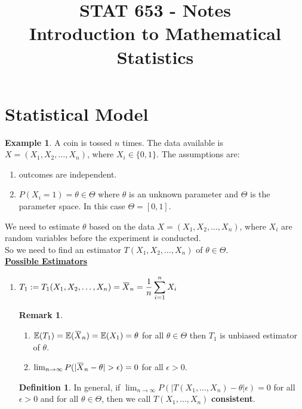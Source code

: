 \documentclass[12pt]{article}
\title{STAT 653 - Notes \\
Introduction to Mathematical Statistics}
\newcommand{\overbar}[1]{\mkern 1.5mu\overline{\mkern-1.5mu#1\mkern-1.5mu}\mkern 1.5mu}
\theoremstyle{definition}
\newtheorem*{definition}{Definition}
\newtheorem*{example}{Example}
\newtheorem*{remark}{Remark}
\begin{document}
\maketitle
\tableofcontents

\section{Statistical Model}

\begin{example}
A coin is tossed $n$ times. The data available is $X = (X_1, X_2, \ldots, X_n)$, 
where $X_i \in \{0, 1\}$. The assumptions are:

\begin{enumerate}
\item outcomes are independent.
\item $P(X_i = 1) = \theta \in \Theta$ where $\theta$ is an unknown parameter
and $\Theta$ is the parameter space. In this case $\Theta = [0,1]$.
\end{enumerate}

We need to estimate $\theta$ based on the data $X = (X_1, X_2, \ldots, X_n)$,
where $X_i$ are random variables before the experiment is conducted. \\

So we need to find an estimator $T(X_1, X_2, \ldots, X_n)$ of $\theta \in \Theta$.\\

\underline{\textbf{Possible Estimators}}

\begin{enumerate}

\item $\displaystyle T_1 := T_1 (X_1, X_2, \ldots, X_n) = \overbar{X}_n = \frac{1}{n} \sum_{i = 1}^{n} X_i$

\begin{remark}
\begin{enumerate}[label = (\alph*)]
\item $\displaystyle \mathbb{E}(T_1) = \mathbb{E}(\overbar{X}_n) = \mathbb{E}(X_1) = \theta$
for all $\theta \in \Theta$ then $T_1$ is unbiased estimator of $\theta$.

\item $\lim_{n \rightarrow \infty} P(| \overbar{X}_n - \theta| > \epsilon ) = 0$ for all
$\epsilon > 0$.
\end{enumerate}
\end{remark}


\begin{definition}
In general, if $\displaystyle \lim_{n \rightarrow \infty} P(|T(X_1, \ldots, X_n) - \theta|  \epsilon) = 0$
for all $\epsilon > 0$ and for all $\theta \in \Theta$, then we call 
$T(X_1, \ldots, X_n)$ \textbf{consistent}.
\end{definition}


\end{enumerate}
\end{example}
\end{document}
